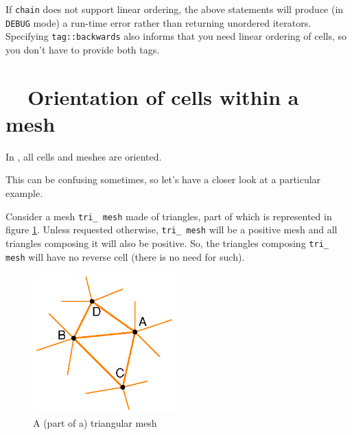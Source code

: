 If {\small\tt chain} does not support linear ordering, the above statements will produce
(in {\small\tt DEBUG} mode) a run-time error rather than returning unordered iterators.
Specifying {\small\tt\textcolor{tag}{tag}::backwards} also informs {\maniFEM} that you need
linear ordering of cells, so you don't have to provide both tags.

\section{~~Orientation of cells within a mesh}\label{\numb section 9.\numb parag 5}

In \maniFEM, all cells and meshes are oriented.

This can be confusing sometimes, so let's have a closer look at a particular example.

Consider a mesh {\small\tt tri\_\,mesh} made of triangles, part of which is represented
in figure \ref{\numb section 9.\numb fig 2}.
Unless requested otherwise, {\small\tt tri\_\,mesh} will be a positive mesh and all triangles
composing it will also be positive.
So, the triangles composing {\small\tt tri\_\,mesh} will have no reverse cell
(there is no need for such).

\begin{figure}[ht] \centering
  \includegraphics[width=55mm]{malha-tri}
  \caption{A (part of a) triangular mesh}
  \label{\numb section 9.\numb fig 2}
\end{figure}


